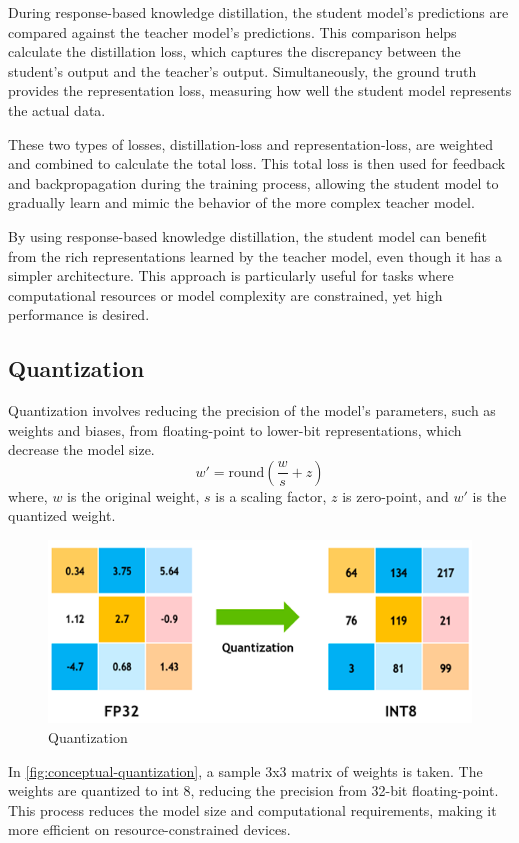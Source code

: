     
    During response-based knowledge distillation, the student model's predictions are compared against the teacher model's predictions. This comparison helps calculate the distillation loss, which captures the discrepancy between the student's output and the teacher's output. Simultaneously, the ground truth provides the representation loss, measuring how well the student model represents the actual data.
    
    These two types of losses, distillation-loss and representation-loss, are weighted and combined to calculate the total loss. This total loss is then used for feedback and backpropagation during the training process, allowing the student model to gradually learn and mimic the behavior of the more complex teacher model.
    
    By using response-based knowledge distillation, the student model can benefit from the rich representations learned by the teacher model, even though it has a simpler architecture. This approach is particularly useful for tasks where computational resources or model complexity are constrained, yet high performance is desired.
      

    \subsection{Quantization}
    Quantization involves reducing the precision of the model's parameters, such as weights and biases, from floating-point to lower-bit representations, which decrease the model size.
    \begin{equation}
        w' = \text{round}\left(\frac{w}{s} + z \right)
    \end{equation}
    where, \( w \) is the original weight, \( s \) is a scaling factor, \( z \) is zero-point, and \( w' \) is the quantized weight.

    \begin{figure}[H]
            \centering
            \includegraphics[width=\linewidth]{assets/quantization.png}
            \caption{Quantization}
            \label{fig:conceptual-quantization}
    \end{figure}
    In \autoref{fig:conceptual-quantization}, a sample 3x3 matrix of weights is taken. The weights are quantized to int 8, reducing the precision from 32-bit floating-point. This process reduces the model size and computational requirements, making it more efficient on resource-constrained devices.

